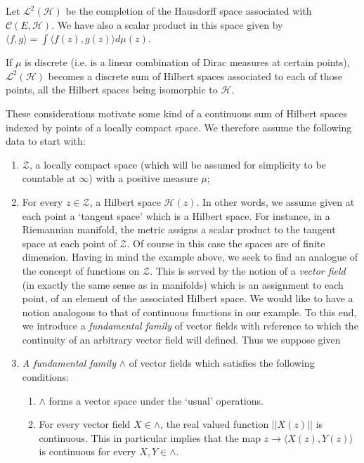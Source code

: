 Let $\mathscr{L}^2 (\mathscr{H})$ be the completion of the
Hausdorff space associated with $\mathscr{C}(E,\mathscr{H})$. We have
also a scalar product in this space given by $\langle f,g \rangle =
\int \langle f(z),g(z)\rangle  d\mu(z)$. 

If $\mu$ is discrete (i.e. is a linear combination of Dirac measures
at certain points), $\mathscr{L}^2 (\mathscr{H})$ becomes a discrete
sum of Hilbert spaces associated to each of those points, all the
Hilbert spaces being isomorphic to $\mathscr{H}$. 

These considerations motivate some kind of a continuous sum of Hilbert
spaces indexed by points of a locally compact space. We therefore
assume the following data to start with: 
\begin{enumerate}
\renewcommand{\labelenumi}{(\theenumi)}
\item $\mathcal{Z}$, a locally compact space (which will be assumed
  for simplicity to be countable at $\infty$) with a positive measure
  $\mu$; 

\item For every $z \in \mathcal{Z}$, a Hilbert space
  $\mathscr{H}(z)$. In other words, we assume given at each point a
  `tangent space' which is a Hilbert space. For instance, in a
  Riemannian manifold, the metric assigns a scalar product to the
  tangent space at each point of $\mathcal{Z}$. Of course in this case
  the spaces are of finite dimension. Having in mind the example
  above, we seek to find an analogue of the concept of functions on
  $\mathcal{Z}$. This is served by the notion of a \textit{vector
    field} (in exactly the same sense as in manifolds) which is an
  assignment to each point, of an element of the associated Hilbert
  space. We would like to have a notion analogous to that of
  continuous functions in our example. To this end, we introduce a
  \textit{fundamental family}\pageoriginale 
   of vector fields with reference to which the continuity of an
  arbitrary vector field will defined. Thus we 
  suppose given 

\item \textit{A fundamental family} $\wedge$ of vector fields which
  satisfies the following conditions: 
\begin{enumerate}
\renewcommand{\theenumii}{\alph{enumii}}
\renewcommand{\labelenumii}{(\theenumii)}
\item $\wedge$ forms a vector space under the `usual' operations.

\item For every vector field $X \in \wedge$, the real valued function
  $|| X(z) ||$ is continuous. This in particular implies that the map
  $z \to \langle X(z),Y(z) \rangle $ is continuous for every $X,Y \in
  \wedge$. 


\end{enumerate}
\end{enumerate}
